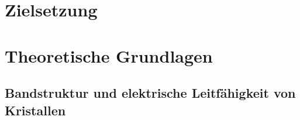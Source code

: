 \section{Zielsetzung}



\section{Theoretische Grundlagen}

\subsection{Bandstruktur und elektrische Leitfähigkeit von Kristallen}

